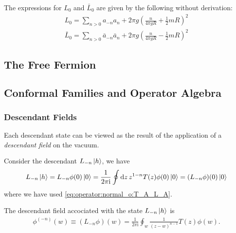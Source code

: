 \documentclass[10pt]{article}
\newcommand{\ii}{\mathrm{i}}
\begin{document}
The expressions for $L_0$ and $\bar{L}_0$ are given by the following without derivation:
\begin{subequations}
    \begin{align}
        L_0=\sum_{n>0}a_{-n}a_{n}+2\pi g\left(\frac{n}{4\pi g R}+\frac{1}{2}mR\right)^2 \\
        \bar{L}_0=\sum_{n>0}\bar{a}_{-n}\bar{a}_{n}+2\pi g\left(\frac{n}{4\pi g R}-\frac{1}{2}mR\right)^2
    \end{align}
\end{subequations}
\subsection{The Free Fermion}
\subsection{Conformal Families and Operator Algebra}
\subsubsection{Descendant Fields}
\begin{intu}
    Each descendant state can be viewed as the result of the application of a \textit{descendant field} on the vacuum.
\end{intu}
\begin{example}
    Consider the descendant $L_{-n}\ket{h}$, we have 
    \begin{align}
        L_{-n}\ket{h}=L_{-n}\phi(0)\ket{0}=\frac{1}{2\pi\ii}\oint\dd{z}z^{1-n}T(z)\phi(0)\ket{0}=(L_{-n}\phi)(0)\ket{0}
    \end{align}
    where we have used \cref{eq:operator:normal_o:T_A_L_A}.
\end{example}
\begin{definition}\label{def:descendant_field}
    The descendant field accociated with the state $L_{-n}\ket{h}$ is 
    \begin{align}
        \phi^{(-n)}(w)\equiv(L_{-n}\phi)(w)=\frac{1}{2\pi\ii}\oint_w\frac{1}{(z-w)^{n-1}}T(z)\phi(w).
    \end{align}
\end{definition}
\end{document}
